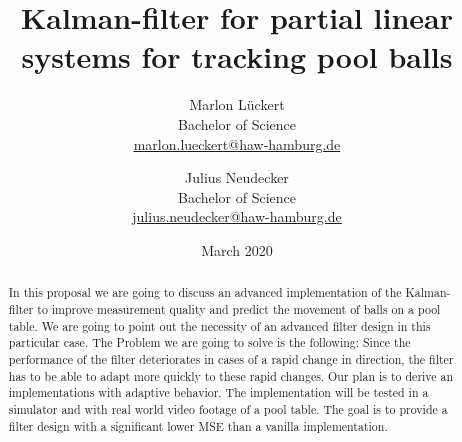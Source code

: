 \documentclass[titlepage, a4paper, 11pt]{scrartcl}
\begin{document}
\title{Kalman-filter for partial linear systems for tracking pool balls}
\author{Marlon Lückert \\ Bachelor of Science \\ \href{mailto:marlon.lueckert@haw-hamburg.de}{marlon.lueckert@haw-hamburg.de} 
   \and Julius Neudecker \\ Bachelor of Science \\ \href{mailto:julius.neudecker@haw-hamburg.de}{julius.neudecker@haw-hamburg.de} }
\date{March 2020}
\maketitle

\tableofcontents

\begin{abstract}
    In this proposal we are going to discuss an advanced implementation of the Kalman-filter \cite{kalman} to improve measurement quality and predict the movement of balls on a pool table. 
    We are going to point out the necessity of an advanced filter design in this particular case. The Problem we are going to solve is the following:
    Since the performance of the filter deteriorates in cases of a rapid change in direction, the filter has to be able to adapt more quickly to these rapid changes.
    Our plan is to derive an implementations with adaptive behavior. The implementation will be tested in a simulator and with real world video footage of a pool table.
    The goal is to provide a filter design with a significant lower MSE than a vanilla implementation.
\end{abstract}
\end{document}

